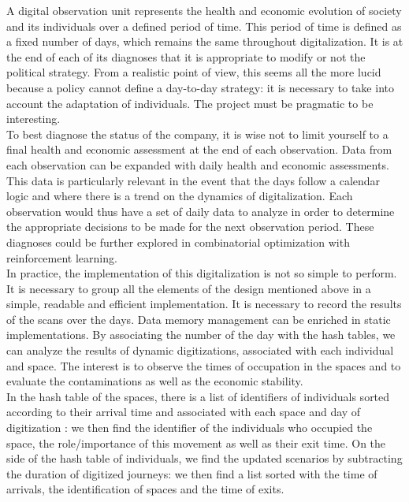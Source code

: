 A digital observation unit represents the health and economic evolution of society and its individuals over a defined period of time. This period of time is defined as a fixed number of days, which remains the same throughout digitalization. It is at the end of each of its diagnoses that it is appropriate to modify or not the political strategy. From a realistic point of view, this seems all the more lucid because a policy cannot define a day-to-day strategy: it is necessary to take into account the adaptation of individuals. The project must be pragmatic to be interesting.\\

To best diagnose the status of the company, it is wise not to limit yourself to a final health and economic assessment at the end of each observation. Data from each observation can be expanded with daily health and economic assessments. This data is particularly relevant in the event that the days follow a calendar logic and where there is a trend on the dynamics of digitalization. Each observation would thus have a set of daily data to analyze in order to determine the appropriate decisions to be made for the next observation period. These diagnoses could be further explored in combinatorial optimization with reinforcement learning.\\

In practice, the implementation of this digitalization is not so simple to perform. It is necessary to group all the elements of the design mentioned above in a simple, readable and efficient implementation. It is necessary to record the results of the scans over the days. Data memory management can be enriched in static implementations. By associating the number of the day with the hash tables, we can analyze the results of dynamic digitizations, associated with each individual and space. The interest is to observe the times of occupation in the spaces and to evaluate the contaminations as well as the economic stability.\\

In the hash table of the spaces, there is a list of identifiers of individuals sorted according to their arrival time and associated with each space and day of digitization : we then find the identifier of the individuals who occupied the space, the role/importance of this movement as well as their exit time. On the side of the hash table of individuals, we find the updated scenarios by subtracting the duration of digitized journeys: we then find a list sorted with the time of arrivals, the identification of spaces and the time of exits.\\

